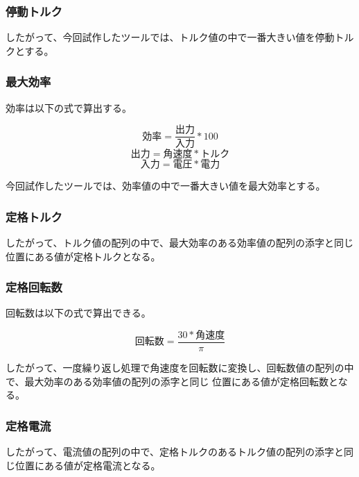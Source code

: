 \subsubsection{停動トルク}\label{sub:keisan_teidoutoruku}
したがって、今回試作したツールでは、トルク値の中で一番大きい値を停動トルクとする。


\subsubsection{最大効率}\label{sub:keisan_saidaikouritu}
効率は以下の式で算出する。

\[
    \mbox{効率} = \frac{\mbox{出力}}{\mbox{入力}}  * 100 
\]
\[
    \mbox{出力} = \mbox{角速度} * \mbox{トルク} 
\]
\[  
    \mbox{入力} = \mbox{電圧} * \mbox{電力} 
\]

今回試作したツールでは、効率値の中で一番大きい値を最大効率とする。



\subsubsection{定格トルク}\label{sub:keisan_teikakutoruku}
したがって、トルク値の配列の中で、最大効率のある効率値の配列の添字と同じ位置にある値が定格トルクとなる。



\subsubsection{定格回転数}\label{sub:keisan_teikakukaiten}
回転数は以下の式で算出できる。

\[
    \mbox{回転数} = \frac{30 * \mbox{角速度}}{\pi}   
\]

したがって、一度繰り返し処理で角速度を回転数に変換し、回転数値の配列の中で、最大効率のある効率値の配列の添字と同じ
位置にある値が定格回転数となる。


\subsubsection{定格電流}\label{sub:keisan_teikakuden}
したがって、電流値の配列の中で、定格トルクのあるトルク値の配列の添字と同じ位置にある値が定格電流となる。

